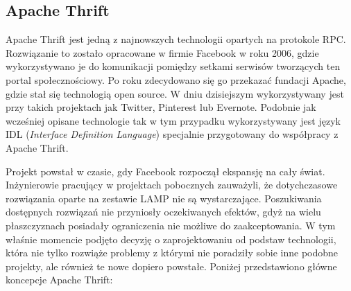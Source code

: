 \subsection{Apache Thrift}
Apache Thrift jest jedną z najnowszych technologii opartych na protokole RPC\@. Rozwiązanie to zostało opracowane w firmie Facebook w roku 2006, gdzie wykorzystywano je do komunikacji pomiędzy setkami serwisów tworzących ten portal społecznościowy. Po roku zdecydowano się go przekazać fundacji Apache, gdzie stał się technologią open source. W dniu dzisiejszym wykorzystywany jest przy takich projektach jak Twitter, Pinterest lub Evernote. Podobnie jak wcześniej opisane technologie tak w tym przypadku wykorzystywany jest język IDL (\textit{Interface Definition Language}) specjalnie przygotowany do współpracy z Apache Thrift. \par Projekt powstał w czasie, gdy Facebook rozpoczął ekspansję na cały świat. Inżynierowie pracujący w projektach pobocznych zauważyli, że dotychczasowe rozwiązania oparte na zestawie LAMP nie są wystarczające\cite{slee2007thrift}. Poszukiwania dostępnych rozwiązań nie przyniosły oczekiwanych efektów, gdyż na wielu płaszczyznach posiadały ograniczenia nie możliwe do zaakceptowania. W tym właśnie momencie podjęto decyzję o zaprojektowaniu od podstaw technologii, która nie tylko rozwiąże problemy z którymi nie poradziły sobie inne podobne projekty, ale również te nowe dopiero powstałe. Poniżej przedstawiono główne koncepcje Apache Thrift\cite{rakowski2015learning}:
